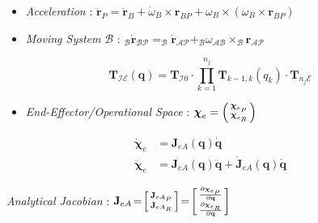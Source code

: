 \documentclass[landscape,a0paper,fontscale=0.285]{baposter} %
\newcommand{\compresslist}{ %
\setlength{\itemsep}{1pt}
\setlength{\parskip}{0pt}
\setlength{\parsep}{0pt}
}
\renewenvironment{bmatrix}{\left[\begin{smallmatrix}}{\end{smallmatrix}\right]}
\renewenvironment{pmatrix}{\left(\begin{smallmatrix}}{\end{smallmatrix}\right)}
\begin{document}
\begin{poster}
{%
\colorbox[HTML]{CCFFFF}{}

\begin{itemize}\compresslist
    \item \textit{Acceleration} : $\ddot{\mathbf{r}}_{P} = \ddot{\mathbf{r}}_{B} + \dot{\omega}_B \times \mathbf{r}_{BP} + \omega_B \times (\omega_B \times \mathbf{r}_{BP})$
    \item \textit{Moving System} $\mathcal{B}$ : $_{\mathcal{B}}\dot{\mathbf{r}}_{\mathcal{BP}} = _{\mathcal{B}}\dot{\mathbf{r}}_{\mathcal{AP}} + _{\mathcal{B}}\omega_{\mathcal{AB}} \times _{\mathcal{B}}\mathbf{r}_{\mathcal{AP}}$
\end{itemize}


\colorbox[HTML]{CCFFFF}{}
\[
\mathbf{T}_{\mathcal{IE}}(\mathbf{q}) = \mathbf{T}_{\mathcal{I}0}\cdot\prod_{k=1}^{n_j}\mathbf{T}_{k-1,k}(q_k)\cdot \mathbf{T}_{n_j\mathcal{E}}
\]

\begin{itemize}\compresslist
    \item \textit{End-Effector/Operational Space} : $\boldsymbol{\chi}_e=\begin{pmatrix} \boldsymbol{\chi}_{e_P}\\ \boldsymbol{\chi}_{e_R}\end{pmatrix}$
\end{itemize}

\colorbox[HTML]{CCFFFF}{}
 $$\begin{aligned}
\dot{\boldsymbol{\chi}}_e &= \mathbf{J}_{eA}(\mathbf{q})\dot{\mathbf{q}}
 \\
 \ddot{\boldsymbol{\chi}}_e &= \mathbf{J}_{eA}(\mathbf{q})\ddot{\mathbf{q}} + \dot{\mathbf{J}}_{eA}(\mathbf{q})\dot{\mathbf{q}}
\end{aligned}
 $$


         \hspace{-0pt}\textit{Analytical Jacobian} : $\mathbf{J}_{eA}\!=\!\begin{bmatrix}\mathbf{J}_{eA_P}\\\mathbf{J}_{eA_R}\end{bmatrix}\!=\!\begin{bmatrix}\frac{\partial \boldsymbol{\chi}_{e_P}}{\partial \mathbf{q}}\\ \frac{\partial \boldsymbol{\chi}_{e_R}}{\partial \mathbf{q}}\end{bmatrix}$
         \noindent
  
}
\end{poster}
\end{document}
